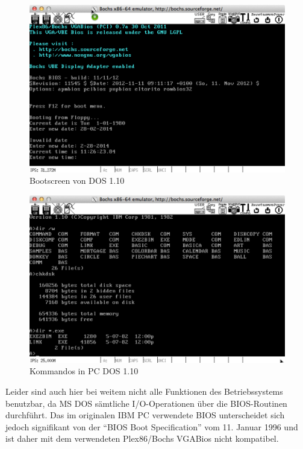 	\begin{figure}[p]
		\begin{center}
			\includegraphics[width=\textwidth]{img/DOS110_1}
			\caption{Bootscreen von DOS 1.10}
			\label{fig:screenshot-dos110boot}
		\end{center}
	\end{figure}

	\begin{figure}[p]
		\begin{center}
			\includegraphics[width=\textwidth]{img/DOS110_2}
			\caption{Kommandos in PC DOS 1.10}
			\label{fig:screenshot-dos110commands}
		\end{center}
	\end{figure}

	Leider sind auch hier bei weitem nicht alle Funktionen des Betriebssystems benutzbar, da MS DOS sämtliche I/O-Operationen über die BIOS-Routinen durchführt.
	Das im originalen IBM PC verwendete BIOS unterscheidet sich jedoch signifikant von der "`BIOS Boot Specification"' vom 11. Januar 1996 und ist daher mit dem verwendeten Plex86/Bochs VGABios nicht kompatibel.

